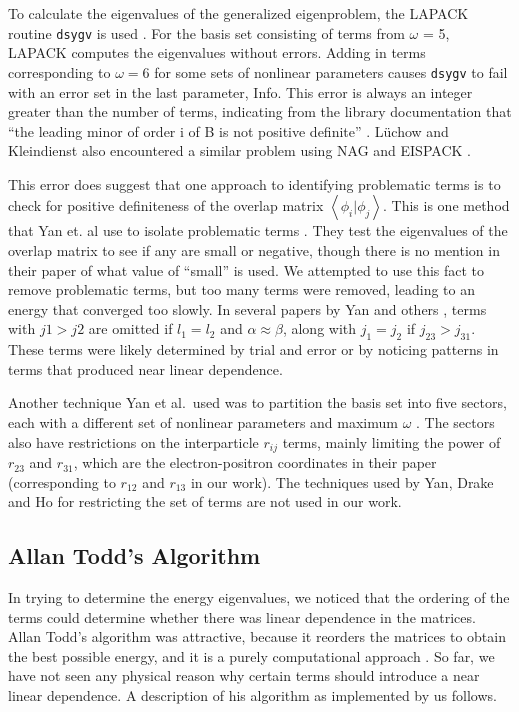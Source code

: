 \documentclass[Dissertation.tex]{subfiles}
\begin{document}
To calculate the eigenvalues of the generalized eigenproblem, the LAPACK 
routine \texttt{dsygv} is used \cite{dsygv}. For the basis set consisting of 
terms from $\omega$ = 5, LAPACK computes the eigenvalues without errors. 
Adding in terms corresponding to $\omega = 6$ for some sets of nonlinear 
parameters causes \texttt{dsygv} to fail with an error set in the last 
parameter, Info. This error is always an integer greater than the number of 
terms, indicating from the library documentation that ``the leading minor of 
order i of B is not positive definite'' \cite{dsygv}. L\"uchow and 
Kleindienst also encountered a similar problem using NAG and EISPACK
\cite{Luchow1993}.

This error does suggest that one approach to identifying problematic terms is 
to check for positive definiteness of the overlap matrix
$\left\langle \phi_i | \phi_j \right\rangle$. This is one method that
Yan et. al use to isolate 
problematic terms \cite{Yan1999}. They test the eigenvalues of the overlap 
matrix to see if any are small or negative, though there is no mention in 
their paper of what value of ``small'' is used. We attempted to use this fact 
to remove problematic terms, but too many terms were removed, leading to an 
energy that converged too slowly. In several papers by Yan and others
\cite{Yan1998,Yan1998a,Yan1999,Drake1995,Yan1997a}, terms with $j1 > j2$ are 
omitted if $l_1 = l_2$ and $\alpha \approx \beta$, along with $j_1 = j_2$ if
$j_{23} > j_{31}$. These terms were likely determined by trial and error 
or by noticing patterns in terms that produced near linear dependence.

Another technique Yan et al.\ used was to partition the basis set into five 
sectors, each with a different set of nonlinear parameters and maximum
$\omega$ \cite{Yan1999}. The sectors also have restrictions on the interparticle
$r_{ij}$ terms, mainly limiting the power of $r_{23}$ and $r_{31}$, which are the 
electron-positron coordinates in their paper (corresponding to $r_{12}$ and
$r_{13}$ in our work). The techniques used by Yan, Drake and Ho for restricting 
the set of terms are not used in our work.


\subsection{Allan Todd's Algorithm}
\label{sec:ToddBound}
In trying to determine the energy eigenvalues, we noticed that the ordering 
of the terms could determine whether there was linear dependence in the 
matrices. Allan Todd's algorithm was attractive, because it reorders the 
matrices to obtain the best possible energy, and it is a purely computational 
approach \cite{Todd2007}. So far, we have not seen any physical reason why 
certain terms should introduce a near linear dependence. A description of his 
algorithm as implemented by us follows.
\end{document}
